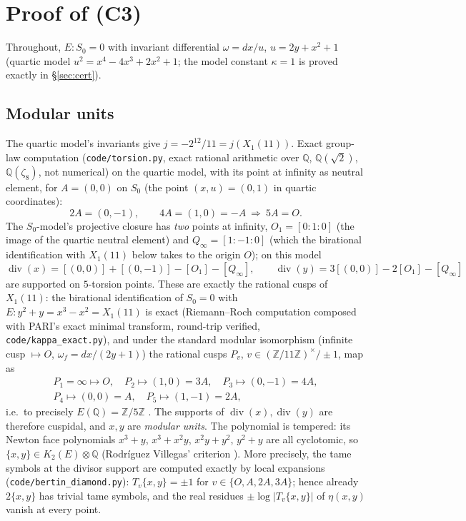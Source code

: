 \documentclass[preprint,12pt]{elsarticle}
\theoremstyle{definition}
\theoremstyle{remark}
\newcommand{\Q}{\mathbb{Q}}
\newcommand{\Z}{\mathbb{Z}}
\DeclareMathOperator{\divisor}{div}
\begin{document}
\section{Proof of (C3)}
\label{sec:proof}

Throughout, $E: S_0=0$ with invariant differential $\omega=dx/u$,
$u=2y+x^2+1$ (quartic model $u^2=x^4-4x^3+2x^2+1$; the model constant
$\kappa=1$ is proved exactly in \S\ref{sec:cert}).

\subsection{Modular units}

The quartic model's invariants give $j=-2^{12}/11=j(X_1(11))$. Exact group-law
computation (\texttt{code/torsion.py}, exact rational arithmetic over $\Q$,
$\Q(\sqrt2)$, $\Q(\zeta_8)$, not numerical) on the quartic model, with its
point at infinity as neutral element, for $A=(0,0)$ on $S_0$ (the point
$(x,u)=(0,1)$ in quartic coordinates):
\[
  2A=(0,-1),\qquad 4A=(1,0)=-A\ \Longrightarrow\ 5A=O.
\]
The $S_0$-model's projective closure has \emph{two} points at infinity,
$O_1=[0:1:0]$ (the image of the quartic neutral element) and
$Q_\infty=[1:-1:0]$ (which the birational identification with $X_1(11)$
below takes to the origin $O$); on this model
\[
  \divisor(x)=[(0,0)]+[(0,-1)]-[O_1]-[Q_\infty],\qquad
  \divisor(y)=3[(0,0)]-2[O_1]-[Q_\infty]
\]
are supported on $5$-torsion points. These are exactly the rational cusps
of $X_1(11)$: the birational identification of $S_0=0$ with
$E:y^2+y=x^3-x^2=X_1(11)$ is exact (Riemann--Roch computation composed
with PARI's exact minimal transform, round-trip verified,
\texttt{code/kappa\_exact.py}), and under the standard modular
isomorphism (infinite cusp $\mapsto O$, $\omega_f=dx/(2y+1)$) the rational
cusps $P_v$, $v\in(\Z/11\Z)^\times/\pm1$, map as
\[
\begin{gathered}
  P_1=\infty\mapsto O,\quad
  P_2\mapsto(1,0)=3A,\quad
  P_3\mapsto(0,-1)=4A,\\
  P_4\mapsto(0,0)=A,\quad
  P_5\mapsto(1,-1)=2A,
\end{gathered}
\]
i.e.\ to precisely $E(\Q)=\Z/5\Z$
\cite[proof of Thm.~8, (3.152)]{Brunault}. The supports of
$\divisor(x),\divisor(y)$ are therefore cuspidal, and $x,y$ are
\emph{modular units}. The polynomial is tempered: its Newton face polynomials
$x^3+y$, $x^3+x^2y$, $x^2y+y^2$, $y^2+y$ are all cyclotomic, so
$\{x,y\}\in K_2(E)\otimes\Q$ (Rodr\'iguez Villegas' criterion \cite{RV}).
More precisely, the tame symbols at the divisor support are computed
exactly by local expansions (\texttt{code/bertin\_diamond.py}):
$T_v\{x,y\}=\pm1$ for $v\in\{O,A,2A,3A\}$; hence already $2\{x,y\}$ has
trivial tame symbols, and the real residues $\pm\log|T_v\{x,y\}|$ of
$\eta(x,y)$ vanish at every point.
\end{document}

